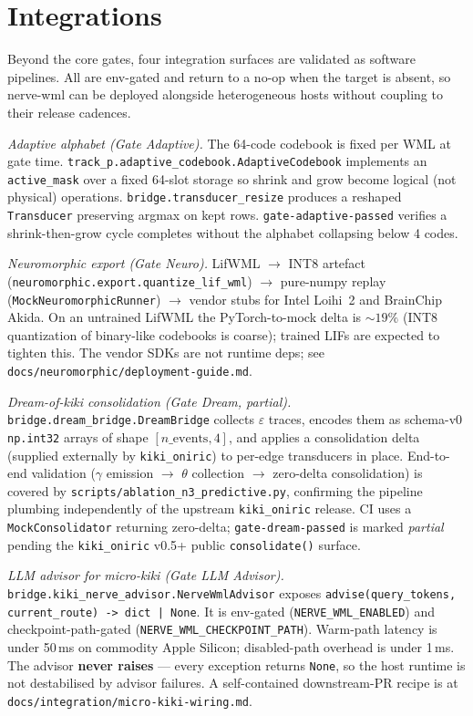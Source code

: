 \documentclass[10pt,twocolumn]{article}
\begin{document}
\section{Integrations}
\label{sec:integrations}

Beyond the core gates, four integration surfaces are validated as software
pipelines. All are env-gated and return to a no-op when the target is absent,
so nerve-wml can be deployed alongside heterogeneous hosts without coupling
to their release cadences.

\textit{Adaptive alphabet (Gate Adaptive).}
The 64-code codebook is fixed per WML at gate time.
\texttt{track\_p.adaptive\_codebook.AdaptiveCodebook} implements an
\texttt{active\_mask} over a fixed 64-slot storage so shrink and grow
become logical (not physical) operations. \texttt{bridge.transducer\_resize}
produces a reshaped \texttt{Transducer} preserving argmax on kept rows.
\texttt{gate-adaptive-passed} verifies a shrink-then-grow cycle completes
without the alphabet collapsing below 4 codes.

\textit{Neuromorphic export (Gate Neuro).} LifWML $\to$ INT8 artefact
(\texttt{neuromorphic.export.quantize\_lif\_wml}) $\to$ pure-numpy
replay (\texttt{MockNeuromorphicRunner}) $\to$ vendor stubs for
Intel Loihi~2 and BrainChip Akida. On an untrained LifWML the
PyTorch-to-mock delta is $\sim 19\%$ (INT8 quantization of binary-like
codebooks is coarse); trained LIFs are expected to tighten this.
The vendor SDKs are not runtime deps; see
\texttt{docs/neuromorphic/deployment-guide.md}.

\textit{Dream-of-kiki consolidation (Gate Dream, partial).}
\texttt{bridge.dream\_bridge.DreamBridge} collects $\varepsilon$ traces,
encodes them as schema-v0 \texttt{np.int32} arrays of shape
$[n\_\text{events}, 4]$, and applies a consolidation delta (supplied
externally by \texttt{kiki\_oniric}) to per-edge transducers in place.
End-to-end validation ($\gamma$ emission $\to$ $\theta$ collection
$\to$ zero-delta consolidation) is covered by
\texttt{scripts/ablation\_n3\_predictive.py}, confirming the pipeline
plumbing independently of the upstream \texttt{kiki\_oniric} release.
CI uses a \texttt{MockConsolidator} returning zero-delta;
\texttt{gate-dream-passed} is marked \emph{partial} pending the
\texttt{kiki\_oniric} v0.5+ public \texttt{consolidate()} surface.

\textit{LLM advisor for micro-kiki (Gate LLM Advisor).}
\texttt{bridge.kiki\_nerve\_advisor.NerveWmlAdvisor} exposes
\texttt{advise(query\_tokens, current\_route) -> dict | None}.
It is env-gated (\texttt{NERVE\_WML\_ENABLED}) and
checkpoint-path-gated (\texttt{NERVE\_WML\_CHECKPOINT\_PATH}). Warm-path
latency is under 50\,ms on commodity Apple Silicon; disabled-path
overhead is under 1\,ms. The advisor \textbf{never raises} --- every
exception returns \texttt{None}, so the host runtime is not destabilised
by advisor failures. A self-contained downstream-PR recipe is at
\texttt{docs/integration/micro-kiki-wiring.md}.
\end{document}
